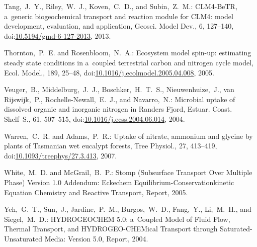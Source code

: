 \documentclass[gmdd, online, hvmath]{copernicus}
\begin{document}
\begin{thebibliography}{55}
Tang,~J.~Y., Riley,~W.~J., Koven,~C.~D., and Subin,~Z.~M.: CLM4-BeTR, a~generic biogeochemical transport and reaction module for CLM4: model development, evaluation, and application, Geosci. Model Dev., 6, 127--140,
doi:\href{http://dx.doi.org/10.5194/gmd-6-127-2013}{10.5194/gmd-6-127-2013}, 2013.




Thornton,~P.~E. and Rosenbloom,~N.~A.:
Ecosystem model spin-up: estimating steady state conditions in a~coupled terrestrial carbon and nitrogen cycle model,
Ecol. Model.,
189, 25--48,
doi:\href{http://dx.doi.org/10.1016/j.ecolmodel.2005.04.008}{10.1016/j.ecolmodel.2005.04.008}, 2005.


Veuger,~B., Middelburg,~J.~J., Boschker,~H.~T.~S., Nieuwenhuize,~J., van Rijswijk,~P., Rochelle-Newall,~E.~J., and Navarro,~N.:
Microbial uptake of dissolved organic and inorganic nitrogen in Randers Fjord,
Estuar. Coast. Shelf~S.,
61, 507--515,
doi:\href{http://dx.doi.org/10.1016/j.ecss.2004.06.014}{10.1016/j.ecss.2004.06.014}, 2004.


Warren,~C.~R. and Adams,~P.~R.:
Uptake of nitrate, ammonium and glycine by plants of Tasmanian wet eucalypt forests,
Tree Physiol.,
27, 413--419,
doi:\href{http://dx.doi.org/10.1093/treephys/27.3.413}{10.1093/treephys/27.3.413}, 2007.


White,~M.~D. and McGrail,~B.~P.:
Stomp (Subsurface Transport Over Multiple Phase) Version 1.0 Addendum: Eckechem Equilibrium-Conservationkinetic Equation Chemistry and Reactive Transport, Report,
  2005.


Yeh,~G.~T., Sun,~J., Jardine,~P.~M., Burgos,~W.~D., Fang,~Y., Li,~M.~H., and Siegel,~M.~D.:
HYDROGEOCHEM 5.0: a~Coupled Model of Fluid Flow, Thermal Transport, and HYDROGEO-CHEMical Transport through Saturated-Unsaturated Media: Version 5.0, Report,
  2004.

\end{thebibliography}
\end{document}
